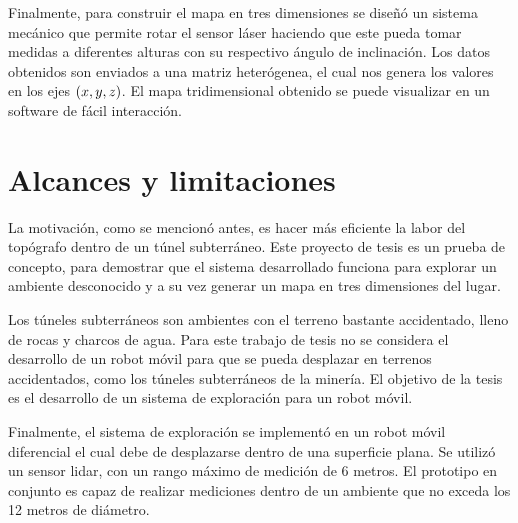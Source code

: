 Finalmente, para construir el mapa en tres dimensiones se diseñó un sistema 
mecánico que permite rotar el sensor láser haciendo que este pueda tomar 
medidas a diferentes alturas con su respectivo ángulo de inclinación. Los datos
obtenidos son enviados a una matriz heterógenea, el cual nos genera los valores
en los ejes $(\mathnormal x,\mathnormal y,\mathnormal z)$. El mapa tridimensional obtenido se puede visualizar en un 
software de fácil interacción.


\section{Alcances y limitaciones}

La motivación, como se mencionó antes, es hacer más eficiente la labor del topógrafo 
dentro de un túnel subterráneo. Este proyecto de tesis es un prueba de concepto, para 
demostrar que el sistema desarrollado funciona para explorar un ambiente desconocido y 
a su vez generar un mapa en tres dimensiones del lugar.

Los túneles subterráneos son ambientes con el terreno bastante accidentado, lleno de
rocas y charcos de agua. Para este trabajo de tesis no se considera el desarrollo de 
un robot móvil para que se pueda desplazar en terrenos accidentados, como los túneles 
subterráneos de la minería. El objetivo de la tesis es el desarrollo de un sistema 
de exploración para un robot móvil. 

Finalmente, el sistema de exploración se implementó en un robot móvil diferencial el 
cual debe de desplazarse dentro de una superficie plana. Se utilizó un sensor lidar, con
un rango máximo de medición de 6 metros. El prototipo en conjunto es capaz de realizar 
mediciones dentro de un ambiente que no exceda los 12 metros de diámetro.

